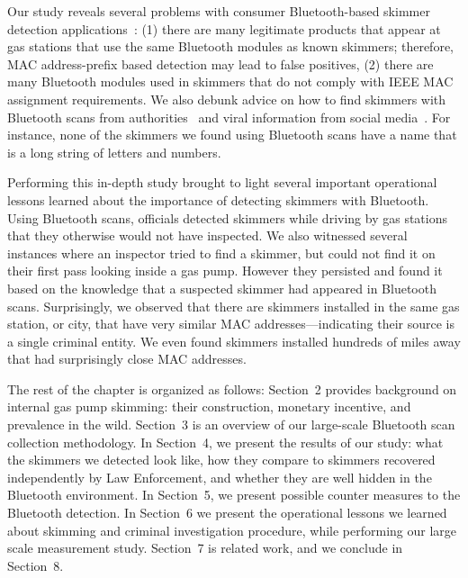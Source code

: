 
 
Our study reveals several problems with consumer Bluetooth-based skimmer
detection applications~\cite{scaifeoakland,sparkfunapp,skimplus}:
%
(1) there are many legitimate products that appear at gas stations that use the
same Bluetooth modules as known skimmers; therefore, MAC address-prefix based detection 
may lead to false positives,
%
(2) there are many Bluetooth modules used in skimmers that do not comply with IEEE MAC
assignment requirements.
%
We also debunk advice on how to find skimmers with Bluetooth scans from authorities~\cite{ag-mn-skimmers} and viral information from social media~\cite{snopesskimmers}.
%
For instance, none of the skimmers we found using Bluetooth scans 
have a name that is a long string of letters and numbers.

Performing this in-depth study brought to light several important operational
lessons learned about the importance of detecting skimmers with Bluetooth.
%
Using Bluetooth scans, officials detected skimmers while
driving by gas stations that they otherwise would not have inspected.
%
We also witnessed several instances where an inspector tried to find a skimmer,
but could not find it on their first pass looking inside a gas pump. However they persisted and found it based on the
knowledge that a suspected skimmer had appeared in
Bluetooth scans.
%
Surprisingly, we observed that there are skimmers installed in the same gas station, or
city, that have very similar MAC addresses---indicating their source is a
single criminal entity.
%
We even found skimmers installed hundreds of miles away that had surprisingly
close MAC addresses.

The rest of the chapter is organized as follows: Section~2 provides background
on internal gas pump skimming: their construction, monetary incentive, and prevalence in
the wild. Section~3 is an overview of our large-scale Bluetooth scan collection methodology.
In Section~4, we
present the results of our study: what the skimmers we detected look like, how they compare to skimmers recovered independently by Law Enforcement, and
whether they are well hidden in the Bluetooth environment. In Section~5, we present
possible counter measures to the Bluetooth detection.  In Section~6 we present the operational lessons we
learned about skimming and criminal investigation procedure, while performing
our large scale measurement study. Section~7 is related work, and we conclude in
Section~8.

